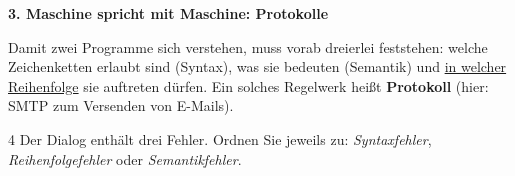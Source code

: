 \documentclass[11pt,a4paper]{article}
\newif\ifloesung
\newcommand{\lsgzeilen}[2]{%
  \vspace{6mm}
  \ifloesung{\small\color{lsgrot}#2\par}\else\linien{#1}\fi}
\begin{document}

\vspace{1em}
\textbf{3. Maschine spricht mit Maschine: Protokolle}

Damit zwei Programme sich verstehen, muss vorab dreierlei feststehen: welche Zeichenketten erlaubt sind (Syntax), was sie bedeuten (Semantik) und \underline{in welcher Reihenfolge} sie auftreten dürfen. Ein solches Regelwerk heißt \textbf{Protokoll} (hier: SMTP zum Versenden von E-Mails).

\begin{aufgabe}{4}
Der Dialog enthält drei Fehler. Ordnen Sie jeweils zu: \emph{Syntaxfehler}, \emph{Reihenfolgefehler} oder \emph{Semantikfehler}.
\end{aufgabe}
\end{document}

